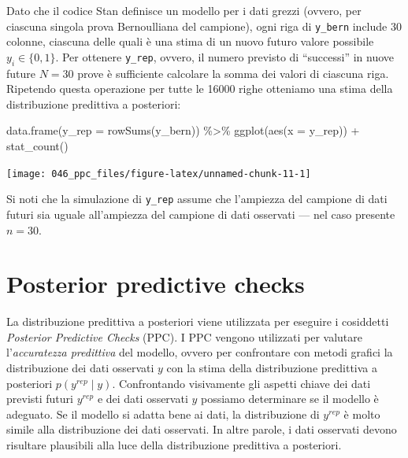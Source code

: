 \documentclass[
  10pt,
  italian,
  a4paper,
  extrafontsizes,onecolumn,openright
  ]{memoir}
\newenvironment{Shaded}{\begin{snugshade}}{\end{snugshade}}
\newcommand{\AttributeTok}[1]{\textcolor[rgb]{0.77,0.63,0.00}{#1}}
\newcommand{\FunctionTok}[1]{\textcolor[rgb]{0.00,0.00,0.00}{#1}}
\newcommand{\NormalTok}[1]{#1}
\newcommand{\SpecialCharTok}[1]{\textcolor[rgb]{0.00,0.00,0.00}{#1}}
\begin{document}
Dato che il codice Stan definisce un modello per i dati grezzi (ovvero, per ciascuna singola prova Bernoulliana del campione), ogni riga di \texttt{y\_bern} include 30 colonne, ciascuna delle quali è una stima di un nuovo futuro valore possibile \(y_i \in \{0, 1\}\). Per ottenere \texttt{y\_rep}, ovvero, il numero previsto di ``successi'' in nuove future \(N = 30\) prove è sufficiente calcolare la somma dei valori di ciascuna riga. Ripetendo questa operazione per tutte le 16000 righe otteniamo una stima della distribuzione predittiva a posteriori:

\begin{Shaded}
\begin{Highlighting}[]
\FunctionTok{data.frame}\NormalTok{(}\AttributeTok{y\_rep =} \FunctionTok{rowSums}\NormalTok{(y\_bern)) }\SpecialCharTok{\%\textgreater{}\%} 
  \FunctionTok{ggplot}\NormalTok{(}\FunctionTok{aes}\NormalTok{(}\AttributeTok{x =}\NormalTok{ y\_rep)) }\SpecialCharTok{+} 
  \FunctionTok{stat\_count}\NormalTok{()}
\end{Highlighting}
\end{Shaded}

\begin{center}\texttt{[image: 046\_ppc\_files/figure-latex/unnamed-chunk-11-1]} \end{center}

Si noti che la simulazione di \texttt{y\_rep} assume che l'ampiezza del campione di dati futuri sia uguale all'ampiezza del campione di dati osservati --- nel caso presente \(n = 30\).

\hypertarget{posterior-predictive-checks}{%
\section{Posterior predictive checks}\label{posterior-predictive-checks}}

La distribuzione predittiva a posteriori viene utilizzata per eseguire i cosiddetti \emph{Posterior Predictive Checks} (PPC). I PPC vengono utilizzati per valutare l'\emph{accuratezza predittiva} del modello, ovvero per confrontare con metodi grafici la distribuzione dei dati osservati \(y\) con la stima della distribuzione predittiva a posteriori \(p(y^{rep} \mid y)\). Confrontando visivamente gli aspetti chiave dei dati previsti futuri \(y^{rep}\) e dei dati osservati \(y\) possiamo determinare se il modello è adeguato. Se il modello si adatta bene ai dati, la distribuzione di \(y^{rep}\) è molto simile alla distribuzione dei dati osservati. In altre parole, i dati osservati devono risultare plausibili alla luce della distribuzione predittiva a posteriori.
\end{document}
